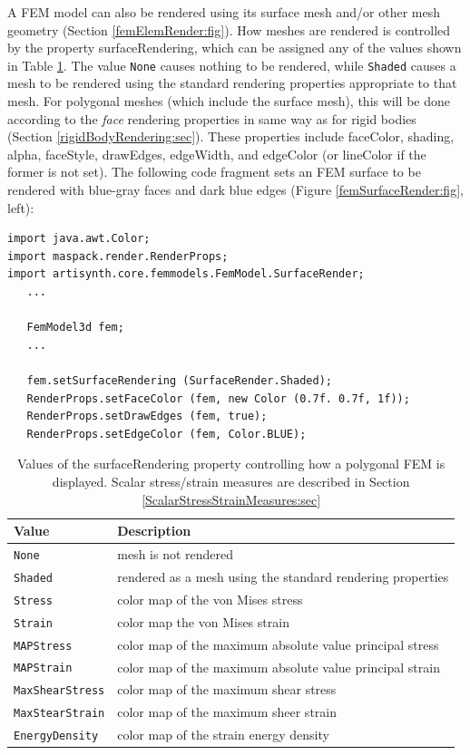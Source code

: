 A FEM model can also be rendered using its surface mesh and/or other
mesh geometry (Section \ref{femElemRender:fig}). How meshes are
rendered is controlled by the property {\sf surfaceRendering}, which
can be assigned any of the values shown in
Table \ref{surfaceRendering:tab}. The value {\tt None} causes nothing
to be rendered, while {\tt Shaded} causes a mesh to be rendered using
the standard rendering properties appropriate to that mesh. For
polygonal meshes (which include the surface mesh), this will be done
according to the {\it face} rendering properties in same way as for
rigid bodies (Section \ref{rigidBodyRendering:sec}). These properties
include {\sf faceColor}, {\sf shading}, {\sf alpha}, {\sf faceStyle},
{\sf drawEdges}, {\sf edgeWidth}, and {\sf edgeColor} (or {\sf
lineColor} if the former is not set). The following code
fragment sets an FEM surface to be rendered with blue-gray
faces and dark blue edges (Figure \ref{femSurfaceRender:fig}, left):
\pdfbreak
%
\begin{lstlisting}[]
import java.awt.Color;
import maspack.render.RenderProps;
import artisynth.core.femmodels.FemModel.SurfaceRender;
   ...

   FemModel3d fem;
   ...

   fem.setSurfaceRendering (SurfaceRender.Shaded);
   RenderProps.setFaceColor (fem, new Color (0.7f. 0.7f, 1f));
   RenderProps.setDrawEdges (fem, true);
   RenderProps.setEdgeColor (fem, Color.BLUE);
\end{lstlisting}
%
\begin{table}[ht]
\caption{Values of the {\sf surfaceRendering} property
controlling how a polygonal FEM is displayed. Scalar stress/strain
measures are described in
Section \ref{ScalarStressStrainMeasures:sec}}
\begin{center}
\begin{tabular}{ll}
\hline
Value & Description\\
\hline
{\tt None} & mesh is not rendered\\
{\tt Shaded} & rendered as a mesh using the standard rendering properties\\
{\tt Stress} & color map of the von Mises stress\\
{\tt Strain} & color map the von Mises strain\\
{\tt MAPStress} & color map of the maximum absolute value principal stress\\
{\tt MAPStrain} & color map of the maximum absolute value principal strain\\
{\tt MaxShearStress} & color map of the maximum shear stress\\
{\tt MaxStearStrain} & color map of the maximum sheer strain\\
{\tt EnergyDensity} & color map of the strain energy density\\
\hline
\end{tabular}
\end{center}
\label{surfaceRendering:tab}
\end{table}
